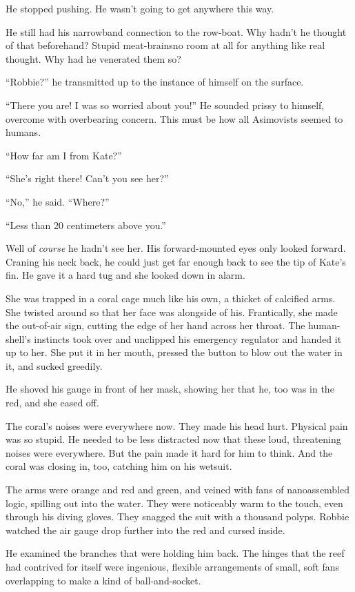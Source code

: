 He stopped pushing. He wasn’t going to get anywhere this way.

He still had his narrowband connection to the row-boat. Why hadn’t
he thought of that beforehand? Stupid meat-brains\dash{}no room at all
for anything like real thought. Why had he venerated them so?

“Robbie?” he transmitted up to the instance of himself on the
surface.

“There you are! I was so worried about you!” He sounded prissy to
himself, overcome with overbearing concern. This must be how all
Asimovists seemed to humans.

“How far am I from Kate?”

“She’s right there! Can’t you see her?”

“No,” he said. “Where?”

“Less than 20 centimeters above you.”

Well of \emph{course} he hadn’t see her. His forward-mounted eyes
only looked forward. Craning his neck back, he could just get far
enough back to see the tip of Kate’s fin. He gave it a hard tug and
she looked down in alarm.

She was trapped in a coral cage much like his own, a thicket of
calcified arms. She twisted around so that her face was alongside
of his. Frantically, she made the out-of-air sign, cutting the edge
of her hand across her throat. The human-shell’s instincts took
over and unclipped his emergency regulator and handed it up to her.
She put it in her mouth, pressed the button to blow out the water
in it, and sucked greedily.

He shoved his gauge in front of her mask, showing her that he, too
was in the red, and she eased off.

The coral’s noises were everywhere now. They made his head hurt.
Physical pain was so stupid. He needed to be less distracted now
that these loud, threatening noises were everywhere. But the pain
made it hard for him to think. And the coral was closing in, too,
catching him on his wetsuit.

The arms were orange and red and green, and veined with fans of
nanoassembled logic, spilling out into the water. They were
noticeably warm to the touch, even through his diving gloves. They
snagged the suit with a thousand polyps. Robbie watched the air
gauge drop further into the red and cursed inside.

He examined the branches that were holding him back. The hinges
that the reef had contrived for itself were ingenious, flexible
arrangements of small, soft fans overlapping to make a kind of
ball-and-socket.

